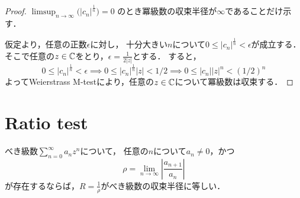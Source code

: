 \documentclass[a4paper]{jsarticle}
\begin{document}
        \begin{proof}
            $\limsup_{n \to \infty} \big( | c_{n} |^\frac{1}{n} \big)=0$
            のとき冪級数の収束半径が$\infty$であることだけ示す．

            仮定より，任意の正数$\epsilon$に対し，
            十分大きい$n$について$0 \leq | c_{n} |^\frac{1}{n} < \epsilon$が成立する．
            そこで任意の$z \in \mathbb{C}$をとり，$\epsilon=\frac{1}{2|z|}$とする．
            すると，
            \[
                0 \leq | c_{n} |^\frac{1}{n} < \epsilon
                \implies
                0 \leq | c_{n} |^\frac{1}{n}|z| < 1/2
                \implies
                0 \leq | c_{n} ||z|^{n} < (1/2)^n
            \]
            よってWeierstrass M-testにより，任意の$z \in \mathbb{C}$について冪級数は収束する．
        \end{proof}

    \section{Ratio test}
        \begin{Them}
        べき級数$\sum_{n=0}^\infty{a_n}z^n$について，
        任意の$n$について$a_n \neq 0$，かつ
        \[
            \rho = \lim_{n \to \infty} \left| \frac{a_{n+1}}{a_n} \right|
        \]
        が存在するならば，$R=\frac{1}{\rho}$がべき級数の収束半径に等しい．
        \end{Them}
\end{document}
